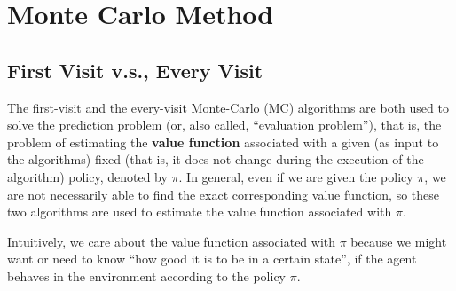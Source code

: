 \chapter{Monte Carlo Method}

\section{First Visit v.s., Every Visit}
The first-visit and the every-visit Monte-Carlo (MC) algorithms are both used to solve the prediction problem (or, also called, ``evaluation problem''), that is, the problem of estimating the \textbf{value function} associated with a given (as input to the algorithms) fixed (that is, it does not change during the execution of the algorithm) policy, denoted by $\pi$. In general, even if we are given the policy $\pi$, we are not necessarily able to find the exact corresponding value function, so these two algorithms are used to estimate the value function associated with $\pi$.

Intuitively, we care about the value function associated with $\pi$ because we might want or need to know ``how good it is to be in a certain state'', if the agent behaves in the environment according to the policy $\pi$.
